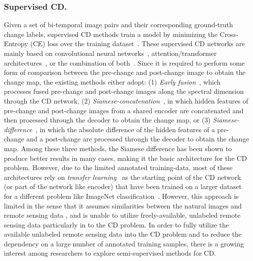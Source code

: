 \documentclass[runningheads]{llncs}
\begin{document}
\subsubsection{Supervised CD.} Given a set of bi-temporal image pairs and their corresponding ground-truth change labels, supervised CD methods train a model by minimizing the Cross-Entropy (CE) loss over the training dataset~\cite{changeformer,bit}. These supervised CD networks are mainly based on convolutional neural networks~\cite{daudt2018fully,daudt2018urban,zhang2021escnet,xu2020pseudo,qu2021change,chen2019change,varghese2018changenet,toker2022dynamicearthnet}, attention/transformer architectures~\cite{changeformer}, or the combination of both~\cite{bit,chen2020dasnet,fang2021snunet,zhang2020deeply,diakogiannis2021looking}. Since it is required to perform some form of comparison between the pre-change and post-change image to obtain the change map, the existing methods either adopt: (1) \textit{Early fusion}~\cite{wiratama2019fusion,zhang2020coarse,song2021efficient,daudt2018urban,daudt2018fully}, which processes fused pre-change and post-change images along the spectral dimension through the CD network, (2) \textit{Siamese-concatenation}~\cite{zhang2021hdfnet,daudt2018fully}, in which hidden features of pre-change and post-change images from a shared encoder are concatenated and then  processed through the decoder to obtain the change map, or (3) \textit{Siamese-difference}~\cite{changeformer,bit,daudt2018fully}, in which the absolute difference of the hidden features of a pre-change and a post-change are processed through the decoder to obtain the change map. Among these three methods, the Siamese difference has been shown to produce better results in many cases, making it the basic architecture for the CD problem. However, due to the limited annotated training-data, most of these architectures rely on \textit{transfer learning}~\cite{bit,8937755} as the starting point of the CD network (or part of the network like encoder) that have been trained on a larger dataset for a different problem like ImageNet classification~\cite{krizhevsky2012imagenet}. However, this approach is limited in the sense that it assumes similarities between the natural images and remote sensing data \cite{manas2021seasonal}, and is unable to utilize freely-available, unlabeled remote sensing data particularly in to the CD problem. In order to fully utilize the available unlabeled remote sensing data into the CD problem and to reduce the dependency on a large number of annotated training samples, there is a growing interest among researchers to explore semi-supervised methods for CD.
\vspace{-6mm}
\end{document}
